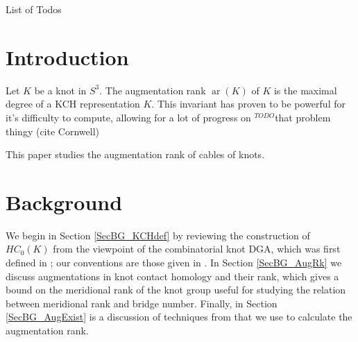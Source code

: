 \documentclass[11pt]{amsart}
\makeatletter
\def\todoit{{\color{red} $^{TODO}$}} %
\def\ar{\operatorname{ar}}
\def\listtodoname{List of Todos}
\def\listoftodos{\@starttoc{tdo}\listtodoname}
\makeatother
\begin{document}
\listoftodos
\newpage


\begin{abstract}

\end{abstract}


\section{Introduction}

Let $K$ be a knot in $S^3$.  The augmentation rank $\ar(K)$ of $K$ is the maximal degree of a KCH representation $K$.  This invariant has proven to be powerful for it's difficulty to compute, allowing for a lot of progress on \todoit that problem thingy (cite Cornwell)

This paper studies the augmentation rank of cables of knots.





\section{Background}
\label{SecBG}

  We begin in Section \ref{SecBG_KCHdef} by reviewing the construction of $HC_0(K)$ from the viewpoint of the combinatorial knot DGA, which was first defined in \cite{Ng08}; our conventions are those given in \cite{Ng12}. In Section \ref{SecBG_AugRk} we discuss augmentations in knot contact homology and their rank, which gives a bound on the meridional rank of the knot group useful for studying the relation between meridional rank and bridge number. Finally, in Section \ref{SecBG_AugExist} is a discussion of techniques from \cite{Cor13b} that we use to calculate the augmentation rank.
\end{document}
